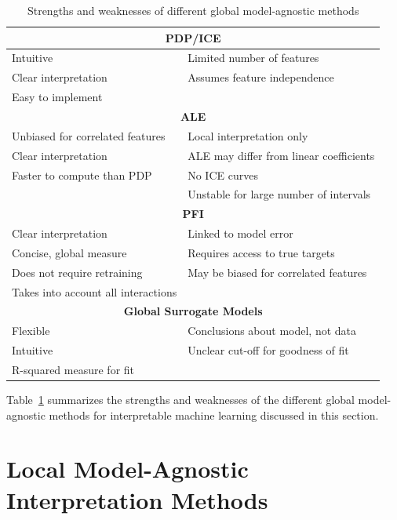 \begin{table}
\centering
\renewcommand{\arraystretch}{1.1}
\begin{tabular}{l|l} \hline
\multicolumn{2}{c}{\textbf{PDP/ICE}} \\ \hline
Intuitive & Limited number of features \\
Clear interpretation & Assumes feature independence \\
Easy to implement & \\ \hline
\multicolumn{2}{c}{\textbf{ALE}} \\ \hline
Unbiased for correlated features & Local interpretation only\\
Clear interpretation & ALE may differ from linear coefficients\\ 
Faster to compute than PDP & No ICE curves \\
& Unstable for large number of intervals \\  \hline
\multicolumn{2}{c}{\textbf{PFI}} \\ \hline
Clear interpretation & Linked to model error \\
Concise, global measure & Requires access to true targets \\
Does not require retraining & May be biased for correlated features \\
Takes into account all interactions & \\ \hline
\multicolumn{2}{c}{\textbf{Global Surrogate Models}} \\ \hline
Flexible & Conclusions about model, not data \\ 
Intuitive & Unclear cut-off for goodness of fit \\
R-squared measure for fit & \\ \hline
\end{tabular}
\caption[Strengths and weaknesses of global model-agnostic methods]{Strengths and weaknesses of different global model-agnostic methods}
\label{tab:summaryglobalmethods}
\end{table}

Table~\ref{tab:summaryglobalmethods} summarizes the strengths and weaknesses of the different global model-agnostic methods for interpretable machine learning discussed in this section.

\section{Local Model-Agnostic Interpretation Methods}

